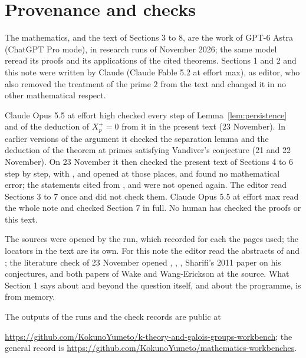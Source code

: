 \documentclass[11pt]{article}
\theoremstyle{definition}
\newcommand{\workbenchurl}{https://github.com/KokunoYumeto/k-theory-and-galois-groups-workbench}
\newcommand{\recordurl}{https://github.com/KokunoYumeto/mathematics-workbenches}
\numberwithin{equation}{section}
\begin{document}
\section*{Provenance and checks}

The mathematics, and the text of Sections 3 to 8, are the work of GPT-6 Astra (ChatGPT Pro mode), in research
runs of November 2026; the same model reread its proofs and its applications of the cited theorems. Sections 1
and 2 and this note were written by Claude (Claude Fable 5.2 at effort max), as editor, who also removed the
treatment of the prime $2$ from the text and changed it in no other mathematical respect.

Claude Opus 5.5 at effort high checked every step of Lemma~\ref{lem:persistence} and of the deduction of
$X_p^+=0$ from it in the present text (23 November). In earlier versions of the argument it checked the
separation lemma and the deduction of the theorem at primes satisfying Vandiver's conjecture (21 and 22
November). On 23 November it then checked the present text of Sections 4 to 6 step by step, with
\cite[Proposition~2.2.6]{WakeWangErickson2017}, \cite[Corollary~2.1.3, Conjecture~2.1.5 and
Corollary~8.1.3(2)]{WakeWangEricksonPseudo2018} and \cite[\S6.1.5 and \S\S7.1.9--7.1.10]{FukayaKato2012} opened at
those places, and found no mathematical error; the statements cited from \cite{MilneLEC2013},
\cite{SharifiIwasawaNotes} and \cite{Iwasawa1981} were not opened again. The editor read Sections 3 to 7 once and
did not check them. Claude Opus 5.5 at effort max read the whole note and checked Section 7 in full. No human has checked the proofs or this text.

The sources were opened by the run, which recorded for each the pages used; the locators in the text are its
own. For this note the editor read the abstracts of \cite{Sharifi2002} and \cite{IshiiKernel2026}; the literature
check of 23 November opened \cite{Sharifi2002}, \cite{Sharifi2019}, \cite{IshiiKernel2026}, Sharifi's 2011
paper on his conjectures, \cite{FukayaKato2012} and both papers of Wake and Wang-Erickson at the source. What
Section 1 says about \cite{AndersonIhara1988} and \cite{Ihara1986} beyond the question itself, and about the
programme, is from memory.

The outputs of the runs and the check records are public at

{\raggedright\smallskip\noindent\url{\workbenchurl}; the general record is \url{\recordurl}.\par}
\end{document}
